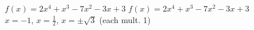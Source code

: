 {$f(x) = 2x^4+x^3-7x^2-3x+3$}
{$f(x) = 2x^4+x^3-7x^2-3x+3$ \\ $x = -1$, $x = \frac{1}{2}$, $x=\pm \sqrt{3}$ (each mult. 1)}